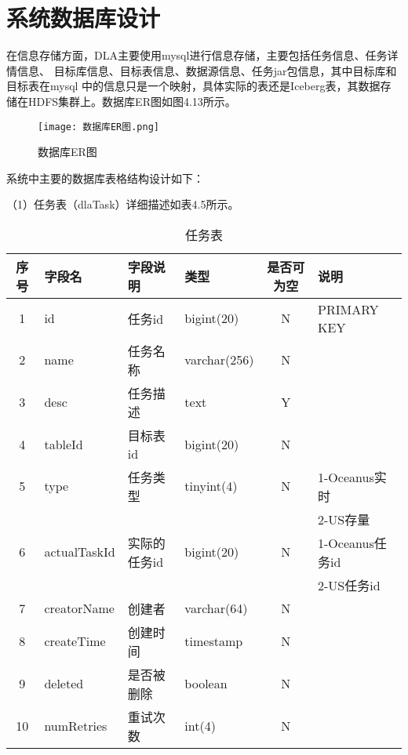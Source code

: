 \section{系统数据库设计}

在信息存储方面，DLA主要使用mysql进行信息存储，主要包括任务信息、任务详情信息、
目标库信息、目标表信息、数据源信息、任务jar包信息，其中目标库和目标表在mysql
中的信息只是一个映射，具体实际的表还是Iceberg表，其数据存储在HDFS集群上。数据库ER图如图4.13所示。

\begin{figure}[h]
  \centering
  \texttt{[image: 数据库ER图.png]}
  \caption{数据库ER图}
  \label{fig:badge}
\end{figure}

系统中主要的数据库表格结构设计如下：

（1）任务表（dlaTask）详细描述如表4.5所示。

\begin{table}[h]
  \centering
  \caption{任务表}
  \label{tab:exampletable}
  \begin{tabular}{clllcl}
    \toprule
    序号  & 字段名         & 字段说明     & 类型           & 是否可为空   & 说明  \\
    \midrule
    1    & id            & 任务id      & bigint(20)     & N          & PRIMARY KEY    \\
    2    & name          & 任务名称     & varchar(256)   & N          &     \\
    3    & desc          & 任务描述     & text           & Y          &   \\
    4    & tableId       & 目标表id     & bigint(20)     & N          &   \\
    5    & type          & 任务类型     & tinyint(4)     & N          & 1-Oceanus实时  \\
         &               &             &               &             & 2-US存量  \\
    6    & actualTaskId  & 实际的任务id  & bigint(20)    & N          &  1-Oceanus任务id  \\
         &               &             &               &             & 2-US任务id  \\
    7    & creatorName   & 创建者       & varchar(64)    & N          &   \\
    8    & createTime    & 创建时间     & timestamp      & N          &   \\
    9    & deleted       & 是否被删除    & boolean        & N          &   \\
    10   & numRetries    & 重试次数      & int(4)        & N          &   \\
    \bottomrule
  \end{tabular}
\end{table}

